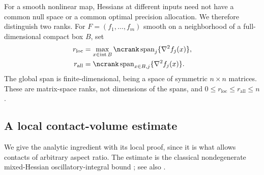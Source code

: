 For a smooth nonlinear map, Hessians at different inputs need not have
a common null space or a common optimal precision allocation. We
therefore distinguish two ranks. For $F=(f_1,\ldots,f_m)$ smooth on a
neighborhood of a full-dimensional compact box $B$, set
\begin{align*}
 r_{\mathrm{loc}}&=\max_{x\in\operatorname{int}B}
       \ncrank\operatorname{span}_j\{\nabla^2 f_j(x)\},\\
 r_{\mathrm{all}}&=\ncrank\operatorname{span}_{x\in B,j}
                                      \{\nabla^2 f_j(x)\}.
\end{align*}
The global span is finite-dimensional, being a space of symmetric
$n\times n$ matrices. These are matrix-space ranks, not dimensions of
the spans, and $0\le r_{\mathrm{loc}}\le r_{\mathrm{all}}\le n$.

\subsection{A local contact-volume estimate}

We give the analytic ingredient with its local proof, since it is what
allows contacts of arbitrary aspect ratio. The estimate is the classical
nondegenerate mixed-Hessian oscillatory-integral bound
\citep[Theorem 1.1]{hormander1973}; see also
\citet[Theorem A, pp.~50--51]{wolff2002}.

